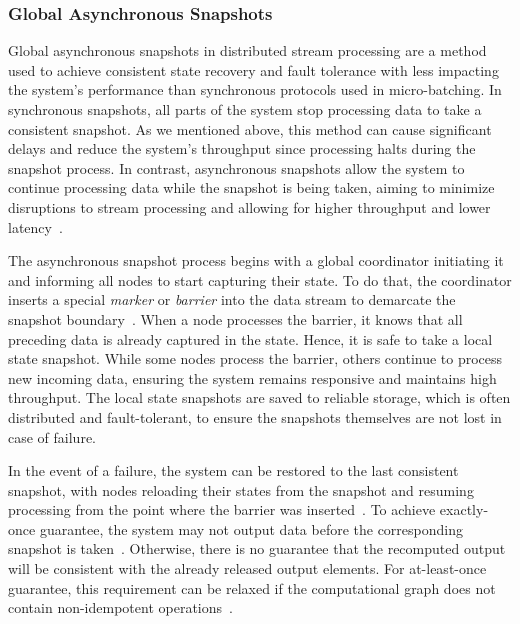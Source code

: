 \subsubsection{Global Asynchronous Snapshots}

Global asynchronous snapshots in distributed stream processing are a method used to achieve consistent state recovery and fault tolerance with less impacting the system's performance than synchronous protocols used in micro-batching. In synchronous snapshots, all parts of the system stop processing data to take a consistent snapshot. As we mentioned above, this method can cause significant delays and reduce the system's throughput since processing halts during the snapshot process. In contrast, asynchronous snapshots allow the system to continue processing data while the snapshot is being taken, aiming to minimize disruptions to stream processing and allowing for higher throughput and lower latency~\cite{2015arXiv150608603C, Carbone:2017:SMA:3137765.3137777}.

The asynchronous snapshot process begins with a global coordinator initiating it and informing all nodes to start capturing their state. To do that, the coordinator inserts a special {\em marker} or {\em barrier} into the data stream to demarcate the snapshot boundary~\cite{2015arXiv150608603C, Carbone:2017:SMA:3137765.3137777}. When a node processes the barrier, it knows that all preceding data is already captured in the state. Hence, it is safe to take a local state snapshot. While some nodes process the barrier, others continue to process new incoming data, ensuring the system remains responsive and maintains high throughput. The local state snapshots are saved to reliable storage, which is often distributed and fault-tolerant, to ensure the snapshots themselves are not lost in case of failure. 

In the event of a failure, the system can be restored to the last consistent snapshot, with nodes reloading their states from the snapshot and resuming processing from the point where the barrier was inserted~\cite{2015arXiv150608603C, Carbone:2017:SMA:3137765.3137777}. To achieve exactly-once guarantee, the system may not output data before the corresponding snapshot is taken~\cite{silvestre2021clonos, thepaper}. Otherwise, there is no guarantee that the recomputed output will be consistent with the already released output elements. For at-least-once guarantee, this requirement can be relaxed if the computational graph does not contain non-idempotent operations~\cite{thepaper}.

